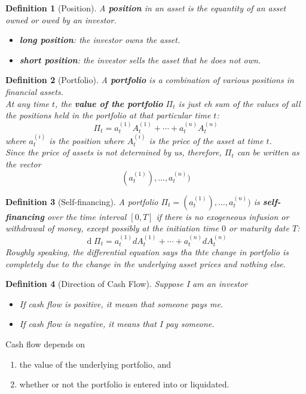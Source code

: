 \documentclass[12pt]{article}
\newtheorem{definition}{Definition}[section]
\theoremstyle{definition}
\DeclareMathOperator{\diff}{d}
\begin{document}
\begin{definition}[Position]
\normalfont A \textbf{position} in an asset is the equantity of an asset owned or owed by an investor.
\begin{itemize}
  \item \textbf{long position}: the investor \textit{owns} the asset.
  \item \textbf{short position}: the investor \textit{sells} the asset that he does not own.
\end{itemize}
\end{definition}
\begin{definition}[Portfolio]
\normalfont A \textbf{portfolio} is a combination of various positions in financial assets.\\
At any time $t$, the \textbf{value of the portfolio} $\Pi_t$ is just eh sum of the values of all the positions held in the portfolio at that particular time $t$:
\[
\Pi_t = a_t^{(1)}A_t^{(1)}+\cdots +a_t^{(n)}A_t^{(n)}
\]
where $a_t^{(i)}$ is the position where $A_t^{(i)}$ is the price of the asset at time $t$.\\
Since the price of assets is not determined by us, therefore, $\Pi_t$ can be written as the vector 
\[
(a_t^{(1)}),\ldots, a_t^{(n)})
\]
\end{definition}
\begin{definition}[Self-financing]
\normalfont A portfolio $\Pi_t=(a_t^{(1)}),\ldots, a_t^{(n)})$ is \textbf{self-financing} over the time interval $[0,T]$ if there is \textit{no} exogeneous infusion or withdrawal of money, \textit{except} possibly at the initiation time $0$ or maturity date $T$:
\[
\diff\Pi_t = a_t^{(1)}dA_t^{(1)}+\cdots +a_t^{(n)}dA_t^{(n)}
\]
Roughly speaking, the differential equation says tha thte change in portfolio is completely due to the change in the underlying asset prices and nothing else.
\end{definition}
\begin{definition}[Direction of Cash Flow]
\normalfont Suppose I am an investor
\begin{itemize}
  \item If cash flow is positive, it measn that someone pays me.
  \item If cash flow is negative, it means that I pay someone.
\end{itemize}
\end{definition}
Cash flow depends on
\begin{enumerate}
  \item the value of the underlying portfolio, and
  \item whether or not the portfolio is entered into or liquidated.
\end{enumerate}
\end{document}
